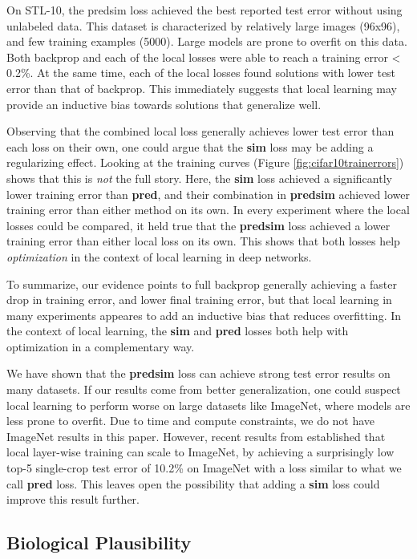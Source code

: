 \documentclass{article}
\begin{document}
On STL-10, the predsim loss achieved the best reported test error without using unlabeled data. This dataset is characterized by relatively large images (96x96), and few training examples (5000). Large models are prone to overfit on this data. Both backprop and each of the local losses were able to reach a training error < 0.2\%. At the same time, each of the local losses found solutions with lower test error than that of backprop. This immediately suggests that local learning may provide an inductive bias towards solutions that generalize well.

Observing that the combined local loss generally achieves lower test error than each loss on their own, one could argue that the \textbf{sim} loss may be adding a regularizing effect. Looking at the training curves (Figure \ref{fig:cifar10trainerrors}) shows that this is \textit{not} the full story. Here, the \textbf{sim} loss achieved a significantly lower training error than \textbf{pred}, and their combination in \textbf{predsim} achieved lower training error than either method on its own. In every experiment where the local losses could be compared, it held true that the \textbf{predsim} loss achieved a lower training error than either local loss on its own. This shows that both losses help \textit{optimization} in the context of local learning in deep networks.

To summarize, our evidence points to full backprop generally achieving a faster drop in training error, and lower final training error, but that local learning in many experiments appeares to add an inductive bias that reduces overfitting. In the context of local learning, the \textbf{sim} and \textbf{pred} losses both help with optimization in a complementary way. 

We have shown that the \textbf{predsim} loss can achieve strong test error results on many datasets. If our results come from better generalization, one could suspect local learning to perform worse on large datasets like ImageNet, where models are less prone to overfit. Due to time and compute constraints, we do not have ImageNet results in this paper. However, recent results from \cite{BelilovskyEO18} established that local layer-wise training can scale to ImageNet, by achieving a surprisingly low top-5 single-crop test error of 10.2\% on ImageNet with a loss similar to what we call \textbf{pred} loss. This leaves open the possibility that adding a \textbf{sim} loss could improve this result further. 

\subsection{Biological Plausibility}
\end{document}
